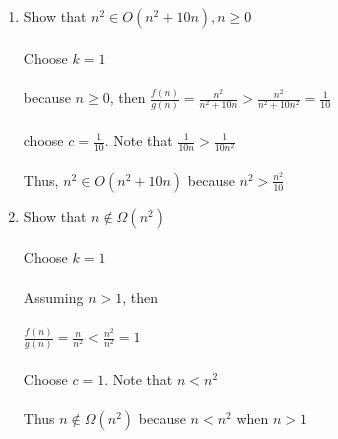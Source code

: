 \documentclass[12pt]{article}
\newcommand\tab[1][1cm]{\hspace*{#1}}
\begin{document}
\begin {enumerate}
\begin {enumerate}[(a)]
		\item
			This sort is stable because the comparison is testing to see if $alist[x] > alist[x+1]$ rather than $list[x] \geq list[x+1]$. Thus, a swap is only made if element x is larger than element x+1. \par 
	\end {enumerate}
\item Show that $n^{2} \in O(n^{2}+10n), n \geq 0$ \\ \\
	\tab Choose $k=1$ \\ \\
	\tab because $n\geq0$, then $\frac{f(n)}{g(n)} = \frac{n^{2}}{n^{2}+10n} > \frac{n^{2}}{n^{2}+10n^{2}} = \frac{1}{10}$ \\ \\
	\tab choose $c=\frac{1}{10}$. Note that $\frac{1}{10n} > \frac{1}{10n^{2}}$\\ \\
	\tab Thus, $n^{2} \in O(n^{2}+10n)$ because $n^{2} > \frac{n^{2}}{10}$ 
\item Show that $n \not\in \Omega(n^{2})$ \\ \\
	\tab Choose $k=1$ \\ \\
	\tab Assuming $n > 1$, then \\ \\
	\tab $\frac{f(n)}{g(n)} = \frac{n}{n^{2}} < \frac{n^{2}}{n^{2}} = 1$ \\ \\
	\tab Choose $c=1$. Note that $n < n^{2}$ \\ \\
	\tab Thus $n \not\in \Omega(n^{2})$ because $n<n^{2}$ when $n>1$
\end {enumerate}
\end{document}
